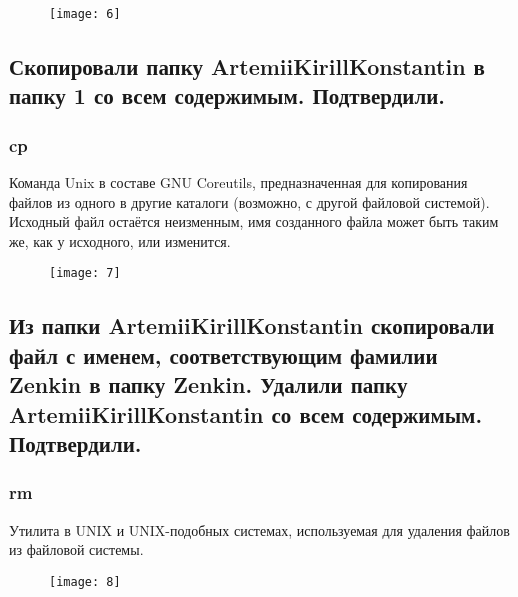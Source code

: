 \begin{figure}[H]
	\begin{center}
		\texttt{[image: 6]}
		\caption{} 
		\label{pic:pic_9} %
	\end{center}
\end{figure}

\subsection{Скопировали папку ArtemiiKirillKonstantin в папку 1 со всем содержимым. Подтвердили.}

\subsubsection{cp}
Команда Unix в составе GNU Coreutils, предназначенная для копирования файлов из одного в другие каталоги (возможно, с другой файловой системой). Исходный файл остаётся неизменным, имя созданного файла может быть таким же, как у исходного, или изменится.

\begin{figure}[H]
	\begin{center}
		\texttt{[image: 7]}
		\caption{} 
		\label{pic:pic_10} %
	\end{center}
\end{figure}

\subsection{Из папки ArtemiiKirillKonstantin скопировали файл с именем, соответствующим фамилии Zenkin в папку Zenkin. Удалили папку ArtemiiKirillKonstantin со всем содержимым. Подтвердили.}

\subsubsection{rm}
Утилита в UNIX и UNIX-подобных системах, используемая для удаления файлов из файловой системы.

\begin{figure}[H]
	\begin{center}
		\texttt{[image: 8]}
		\caption{} 
		\label{pic:pic_11} %
	\end{center}
\end{figure}

\newpage


